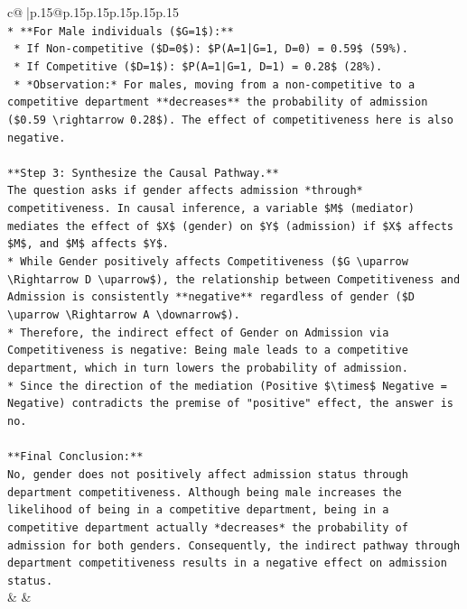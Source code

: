 \documentclass{article}
\begin{document}
{\begin{supertabular}{c@{$\;$}|p{.15\linewidth}@{}p{.15\linewidth}p{.15\linewidth}p{.15\linewidth}p{.15\linewidth}p{.15\linewidth}}
{{{\\ 
\texttt{*   **For Male individuals (\$G=1\$):**} \\
\texttt{    *   If Non{-}competitive (\$D=0\$): \$P(A=1|G=1, D=0) = 0.59\$ (59\%).} \\
\texttt{    *   If Competitive (\$D=1\$): \$P(A=1|G=1, D=1) = 0.28\$ (28\%).} \\
\texttt{    *   *Observation:* For males, moving from a non{-}competitive to a competitive department **decreases** the probability of admission (\$0.59 \textbackslash{}rightarrow 0.28\$). The effect of competitiveness here is also negative.} \\
\\ 
\texttt{**Step 3: Synthesize the Causal Pathway.**} \\
\texttt{The question asks if gender affects admission *through* competitiveness. In causal inference, a variable \$M\$ (mediator) mediates the effect of \$X\$ (gender) on \$Y\$ (admission) if \$X\$ affects \$M\$, and \$M\$ affects \$Y\$.} \\
\texttt{*   While Gender positively affects Competitiveness (\$G \textbackslash{}uparrow \textbackslash{}Rightarrow D \textbackslash{}uparrow\$), the relationship between Competitiveness and Admission is consistently **negative** regardless of gender (\$D \textbackslash{}uparrow \textbackslash{}Rightarrow A \textbackslash{}downarrow\$).} \\
\texttt{*   Therefore, the indirect effect of Gender on Admission via Competitiveness is negative: Being male leads to a competitive department, which in turn lowers the probability of admission.} \\
\texttt{*   Since the direction of the mediation (Positive \$\textbackslash{}times\$ Negative = Negative) contradicts the premise of "positive" effect, the answer is no.} \\
\\ 
\texttt{**Final Conclusion:**} \\
\texttt{No, gender does not positively affect admission status through department competitiveness. Although being male increases the likelihood of being in a competitive department, being in a competitive department actually *decreases* the probability of admission for both genders. Consequently, the indirect pathway through department competitiveness results in a negative effect on admission status.} \\
            }
        }
    }
    & & \\ \\


\end{supertabular}}
\end{document}
